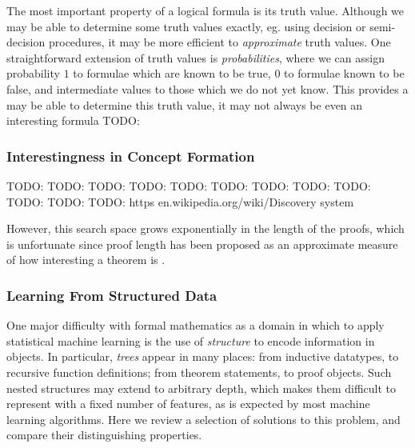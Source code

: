 \documentclass[]{article}
\begin{document}
The most important property of a logical formula is its truth value. Although we may be able to determine some truth values exactly, eg. using decision or semi-decision procedures, it may be more efficient to \emph{approximate} truth values. One straightforward extension of truth values is \emph{probabilities}, where we can assign probability $1$ to formulae which are known to be true, $0$ to formulae known to be false, and intermediate values to those which we do not yet know. This provides a   may be able to determine this truth value, it may not always be even an interesting formula
TODO: \cite{Hutter.Lloyd.Ng.ea:2013}

\subsubsection{Interestingness in Concept Formation}
\label{conceptformation}

TODO: \cite{Montano-Rivas.McCasland.Dixon.ea:2012}
TODO: \cite{Piantadosi.Tenenbaum.Goodman:2012}
TODO: \cite{Wille:2005}
TODO: \cite{colton1999automatic}
TODO: \cite{colton2000agent}
TODO: \cite{colton2012automated}
TODO: \cite{lenat1977automated}
TODO: \cite{mullerunderstanding}
TODO: \cite{Bundy.Cavallo.Dixon.ea:2015}
TODO: \cite{johansson2009isacosy}
TODO: \cite{spector2008genetic}
TODO: https en.wikipedia.org/wiki/Discovery system

However, this search space grows exponentially in the length of the proofs, which is unfortunate since proof length has been proposed as an approximate measure of how interesting a theorem is \cite[\S~10.2.1]{colton2012automated}.




\subsubsection{Learning From Structured Data}

One major difficulty with formal mathematics as a domain in which to apply statistical machine learning is the use of \emph{structure} to encode information in objects. In particular, \emph{trees} appear in many places: from inductive datatypes, to recursive function definitions; from theorem statements, to proof objects. Such nested structures may extend to arbitrary depth, which makes them difficult to represent with a fixed number of features, as is expected by most machine learning algorithms. Here we review a selection of solutions to this problem, and compare their distinguishing properties.
\end{document}
